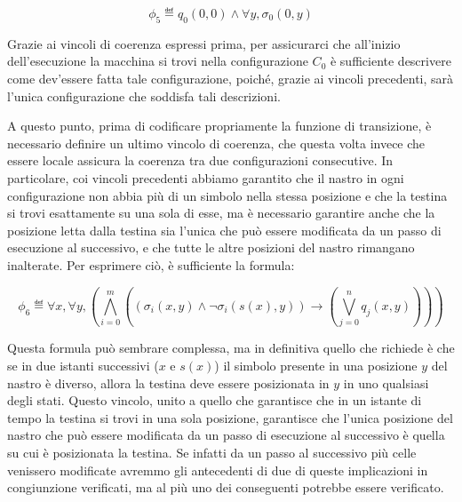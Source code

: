 \begin{equation}
  \phi_5 \eqdef q_0(0,0) \land \forall y, \sigma_0(0,y)
\end{equation}

Grazie ai vincoli di coerenza espressi prima, per assicurarci che all'inizio dell'esecuzione la macchina si trovi nella configurazione \(C_0\) è sufficiente descrivere come dev'essere fatta tale configurazione, poiché, grazie ai vincoli precedenti, sarà l'unica configurazione che soddisfa tali descrizioni.

A questo punto, prima di codificare propriamente la funzione di transizione, è necessario definire un ultimo vincolo di coerenza, che questa volta invece che essere locale assicura la coerenza tra due configurazioni consecutive. In particolare, coi vincoli precedenti abbiamo garantito che il nastro in ogni configurazione non abbia più di un simbolo nella stessa posizione e che la testina si trovi esattamente su una sola di esse, ma è necessario garantire anche che la posizione letta dalla testina sia l'unica che può essere modificata da un passo di esecuzione al successivo, e che tutte le altre posizioni del nastro rimangano inalterate. Per esprimere ciò, è sufficiente la formula:

\begin{equation}
  \phi_6 \eqdef \forall x, \forall y, \left(\bigwedge_{i=0}^{m} \left(\left(\sigma_i\left(x,y\right) \land \neg \sigma_i\left(s\left(x\right),y\right)\right) \to \left(\bigvee_{j=0}^{n} q_j\left(x,y\right)\right)\right)\right)
\end{equation}

Questa formula può sembrare complessa, ma in definitiva quello che richiede è che se in due istanti successivi (\(x\) e \(s(x)\)) il simbolo presente in una posizione \(y\) del nastro è diverso, allora la testina deve essere posizionata in \(y\) in uno qualsiasi degli stati. Questo vincolo, unito a quello che garantisce che in un istante di tempo la testina si trovi in una sola posizione, garantisce che l'unica posizione del nastro che può essere modificata da un passo di esecuzione al successivo è quella su cui è posizionata la testina. Se infatti da un passo al successivo più celle venissero modificate avremmo gli antecedenti di due di queste implicazioni in congiunzione verificati, ma al più uno dei conseguenti potrebbe essere verificato.

